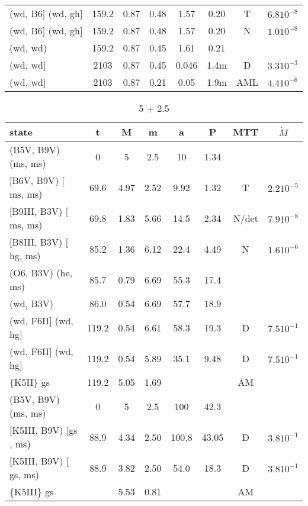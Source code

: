 \documentclass{article}
\begin{document}
\begin{table}
\begin{tabular}{p{4cm}ccccccc}
(wd, B6$]$ (wd, gh$]$	& 159.2	& 0.87	& 0.48	& 1.57 	& 0.20 	& T     & $6.8 10^{-8}$		\\
(wd, B6$]$ (wd, gh$]$	& 159.2	& 0.87	& 0.48	& 1.57 	& 0.20 	& N     & $1.0 10^{-8}$		\\
(wd, wd)         	& 159.2	& 0.87	& 0.45	& 1.61 	& 0.21 	&       &               	\\
(wd, wd$]$         	& 2103 	& 0.87	& 0.45	& 0.046	& 1.4m 	& D     & $3.3 10^{-3}$		\\
(wd, wd$]$         	& 2103 	& 0.87	& 0.21	& 0.05 	& 1.9m 	& AML   & $4.4 10^{-6}$		\\
\hline
\end{tabular}
\end{table}

\begin{table}
\caption{ 5 + 2.5}
\begin{tabular}{p{4cm}ccccccc}
\hline
state 		    	& t 	& M	& m	& a	& P	& MTT	&$\dot{M}$		\\ \hline 
(B5V, B9V) (ms, ms)	& 0	& 5	& 2.5	& 10	& 1.34	&       &			\\
$[$B6V, B9V) $[$ms, ms)	& 69.6 	& 4.97	& 2.52	& 9.92 	& 1.32 	& T     & $2.2 10^{-5}$		\\
$[$B9III, B3V) $[$ms, ms)	& 69.8 	& 1.83	& 5.66	& 14.5 	& 2.34 	& N/det & $7.9 10^{-8}$		\\
$[$B8III, B3V) $[$hg, ms)	& 85.2 	& 1.36	& 6.12	& 22.4 	& 4.49 	& N     & $1.6 10^{-6}$		\\
(O6, B3V) (he, ms)	& 85.7 	& 0.79	& 6.69	& 55.3 	& 17.4 	&       &               	\\
(wd, B3V)         	& 86.0 	& 0.54	& 6.69	& 57.7 	& 18.9 	&       &               	\\
(wd, F6II$]$ (wd, hg$]$	& 119.2	& 0.54	& 6.61	& 58.3 	& 19.3 	& D     & $7.5 10^{-1}$		\\
(wd, F6II$]$ (wd, hg$]$	& 119.2	& 0.54	& 5.89	& 35.1 	& 9.48 	& D     & $7.5 10^{-1}$		\\
\{K5II\} gs        	& 119.2	& 5.05	& 1.69	&      	&      	& AM    &      			\\
\hline
(B5V, B9V) (ms, ms)	& 0	& 5	& 2.5	& 100	& 42.3	&       &			\\
$[$K5III, B9V) $[$gs , ms)	& 88.9 	& 4.34	& 2.50	& 100.8	& 43.05	& D     & $3.8 10^{-1}$		\\
$[$K5III, B9V) $[$gs, ms)	& 88.9 	& 3.82	& 2.50	& 54.0 	& 18.3 	& D     & $3.8 10^{-1}$		\\
\{K5III\} gs		&	& 5.53	& 0.81	&	&	& AM	& 			\\

\end{tabular}
\end{table}
\end{document}
